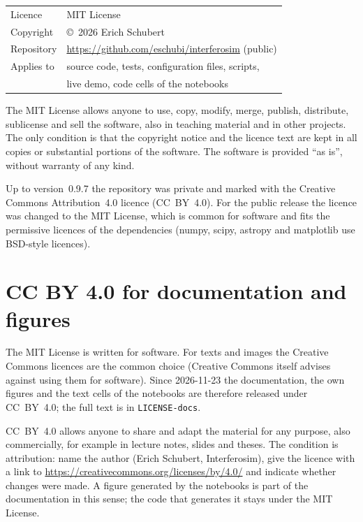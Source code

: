 \begin{center}
\begin{tabular}{@{}ll@{}}
\toprule
Licence & MIT License \\
Copyright & \copyright~2026 Erich Schubert \\
Repository & \url{https://github.com/eschubi/interferosim} (public) \\
Applies to & source code, tests, configuration files, scripts, \\
           & live demo, code cells of the notebooks \\
\bottomrule
\end{tabular}
\end{center}

The MIT License allows anyone to use, copy, modify, merge, publish,
distribute, sublicense and sell the software, also in teaching material
and in other projects. The only condition is that the copyright notice
and the licence text are kept in all copies or substantial portions of
the software. The software is provided \enquote{as is}, without warranty
of any kind.

Up to version~0.9.7 the repository was private and marked with the
Creative Commons Attribution~4.0 licence (CC~BY~4.0). For the public
release the licence was changed to the MIT License, which is common for
software and fits the permissive licences of the dependencies (numpy,
scipy, astropy and matplotlib use BSD-style licences).

\section{CC BY 4.0 for documentation and figures}

The MIT License is written for software. For texts and images the
Creative Commons licences are the common choice (Creative Commons itself
advises against using them for software). Since 2026-11-23 the
documentation, the own figures and the text cells of the notebooks are
therefore released under CC~BY~4.0; the full text is in
\texttt{LICENSE-docs}.

CC~BY~4.0 allows anyone to share and adapt the material for any
purpose, also commercially, for example in lecture notes, slides and
theses. The condition is attribution: name the author (Erich Schubert,
Interferosim), give the licence with a link to
\url{https://creativecommons.org/licenses/by/4.0/} and indicate whether
changes were made. A figure generated by the notebooks is part of the
documentation in this sense; the code that generates it stays under the
MIT License.

